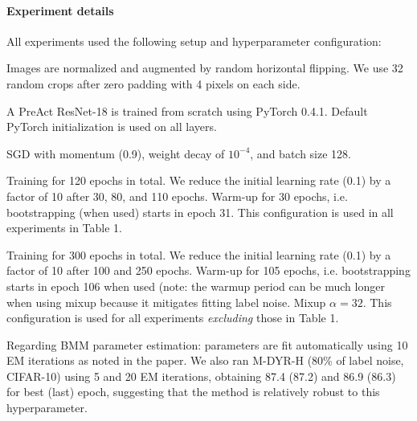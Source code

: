 \documentclass{article}
\begin{document}
\paragraph{Experiment details} All experiments used the following setup and hyperparameter configuration:
\begin{description}
\item[Preprocessing] Images are normalized and augmented by random horizontal flipping. We use 32 random crops after zero padding with 4 pixels on each side.
\item[Network] A PreAct ResNet-18 is trained from scratch using PyTorch 0.4.1. Default PyTorch initialization is used on all layers. 
\item[Optimizer] SGD with momentum (0.9), weight decay of $10^{-4}$, and batch size 128.
\item[Training schedule without mixup] Training for 120 epochs in total. We reduce the initial learning rate (0.1) by a factor of 10 after 30, 80, and
110 epochs. Warm-up for 30 epochs, i.e. bootstrapping (when used) starts
in epoch 31. This configuration is used in all experiments in Table
1.
\item[Training schedule with mixup] Training for 300 epochs in total.
We reduce the initial learning rate  (0.1) by a factor of 10 after 100 and 250
epochs. Warm-up for 105 epochs, i.e. bootstrapping starts
in epoch 106 when used (note: the warmup period can be much longer when using mixup because it mitigates fitting label noise. Mixup $\alpha = 32$. This configuration is used for all experiments \textit{excluding}
those in Table 1.
\item 
\end{description}
Regarding BMM parameter estimation: parameters are fit automatically using 10 EM iterations as noted in the paper. 
We also ran M-DYR-H (80\% of label noise, CIFAR-10) using 5 and 20 EM iterations, obtaining 87.4 (87.2)
and 86.9 (86.3) for best (last) epoch, suggesting that the method is relatively robust to this hyperparameter.
\end{document}
